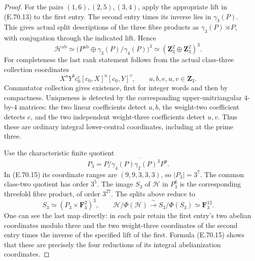 \begin{proof}
For the pairs $(1,6),(2,5),(3,4)$, apply the
appropriate lift in (E.70.13) to the first entry.
The second entry times its inverse lies in
$\gamma_3(P)$. This gives actual split descriptions
of the three fibre products as
$\gamma_3(P)\rtimes P$, with conjugation through
the indicated lift. Hence
\[
 \mathscr H^{\mathrm{ab}}
   \simeq\bigl(P^{\mathrm{ab}}\oplus
                    \gamma_3(P)/\gamma_4(P)\bigr)^3
   \simeq(\mathbf Z_3^2\oplus\mathbf Z_3^2)^3.
 \tag{E.70.14}
\]
For completeness the last rank statement follows
from the actual class-three collection coordinates
\[
 X^aY^b c_0^e[c_0,X]^u[c_0,Y]^v,
                     \qquad a,b,e,u,v\in\mathbf Z_3.
 \tag{E.70.15}
\]
Commutator collection gives existence, first for
integer words and then by compactness. Uniqueness
is detected by the corresponding upper-unitriangular
$4$-by-$4$ matrices: the two linear coefficients
detect $a,b$, the weight-two coefficient detects
$e$, and the two independent weight-three
coefficients detect $u,v$. Thus these are ordinary
integral lower-central coordinates, including at
the prime three.

Use the characteristic finite quotient
\[
 P_3=P/\overline{\gamma_4(P)\gamma_2(P)^3P^9}.
 \tag{E.70.16}
\]
In (E.70.15) its coordinate ranges are
$(9,9,3,3,3)$, so $|P_3|=3^7$. The common
class-two quotient has order $3^5$. The image
$S_3$ of $\mathscr H$ in $P_3^6$ is the corresponding
threefold fibre product, of order $3^{27}$.
The splits above reduce to
\[
 S_3\simeq(P_3\times\mathbf F_3^2)^3,
 \qquad
 \mathscr H/\Phi(\mathscr H)
            \xrightarrow{\ \sim\ }S_3/\Phi(S_3)
            \simeq\mathbf F_3^{12}.
 \tag{E.70.17}
\]
One can see the last map directly: in each pair
retain the first entry's two abelian coordinates
modulo three and the two weight-three coordinates
of the second entry times the inverse of the
specified lift of the first. Formula (E.70.15)
shows that these are precisely the four reductions
of its integral abelianization coordinates.


\end{proof}
